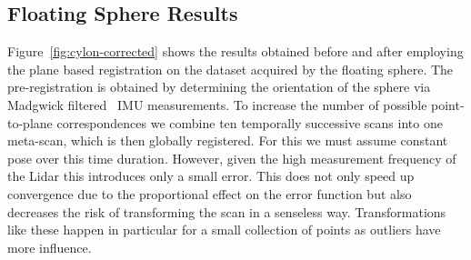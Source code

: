 \subsection{Floating Sphere Results}

Figure~\ref{fig:cylon-corrected} shows the results obtained before and after employing the plane based registration on the dataset acquired by the floating sphere.
The pre-registration is obtained by determining the orientation of the sphere via Madgwick filtered~\cite{madgwick2010efficient} IMU measurements.
To increase the number of possible point-to-plane correspondences we combine ten temporally successive scans into one meta-scan, which is then globally registered. 
For this we must assume constant pose over this time duration. 
However, given the high measurement frequency of the Lidar this introduces only a small error. 
This does not only speed up convergence due to the proportional effect on the error function but also decreases the risk of transforming the scan in a senseless way.
Transformations like these happen in particular for a small collection of points as outliers have more influence.

